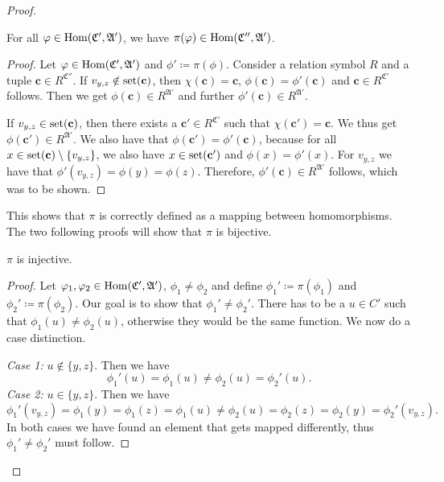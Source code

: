 \begin{proof}
	\begin{claim}
		For all $\varphi\in \operatorname{Hom}(\mathfrak C',\mathfrak A')$, we have $\pi(\varphi)\in\operatorname{Hom}(\mathfrak C'',\mathfrak A')$.
	\end{claim}
	\begin{proof}
		Let $\varphi\in\operatorname{Hom}(\mathfrak C',\mathfrak A')$ and $\phi'\coloneqq \pi(\phi)$.
		Consider a relation symbol $R$ and a tuple $\mathbf c \in R^{\mathfrak C''}$.
		If $v_{y,z}\notin\operatorname{set}(\mathbf c)$, then $\chi(\mathbf c)=\mathbf c$, $\phi(\mathbf c)=\phi'(\mathbf c)$ and $\mathbf c\in R^{\mathfrak C'}$ follows.
		Then we get $\phi(\mathbf c)\in R^{\mathfrak A'}$ and further $\phi'(\mathbf c)\in R^{\mathfrak A'}$.
		
		If $v_{y,z}\in\operatorname{set}(\mathbf c)$, then there exists a $\mathbf c'\in R^{\mathfrak C'}$ such that $\chi(\mathbf c')=\mathbf c$. 
		We thus get $\phi(\mathbf c')\in R^{\mathfrak A'}$.
		We also have that $\phi(\mathbf c')=\phi'(\mathbf c)$, because for all $x \in \operatorname{set}(\mathbf c)\setminus \{v_{y,z}\}$, we also have $x\in\operatorname{set}(\mathbf c')$ and $\phi(x)=\phi'(x)$.
		For $v_{y,z}$ we have that $\phi'(v_{y,z})=\phi(y)=\phi(z)$.
		Therefore, $\phi'(\mathbf c)\in R^{\mathfrak A'}$ follows, which was to be shown.
	\end{proof}
	
	This shows that $\pi$ is correctly defined as a mapping between homomorphisms.
	The two following proofs will show that $\pi$ is bijective.
	
	\begin{claim}
		$\pi$ is injective.
	\end{claim}
	\begin{proof}
		Let $\varphi_1,\varphi_2\in\operatorname{Hom}(\mathfrak C',\mathfrak A')$, $\phi_1\neq\phi_2$ and define $\phi_1'\coloneqq \pi(\phi_1)$ and $\phi_2'\coloneqq \pi(\phi_2)$.
		Our goal is to show that $\phi_1'\neq \phi_2'$.
		There has to be a $u\in C'$ such that $\phi_1(u)\neq\phi_2(u)$, otherwise they would be the same function.
		We now do a case distinction.
		
		\emph{Case 1:} $u\notin\{y,z\}$. Then we have
		$$\phi_1'(u)=\phi_1(u)\neq \phi_2(u)=\phi_2'(u).$$
		\emph{Case 2:} $u\in \{y,z\}$. Then we have 
		$$\phi_1'(v_{y,z})=\phi_1(y)=\phi_1(z)=\phi_1(u)\neq \phi_2(u)=\phi_2(z)=\phi_2(y)=\phi_2'(v_{y,z}).$$
		In both cases we have found an element that gets mapped differently, thus $\phi_1'\neq\phi_2'$ must follow.
	\end{proof}
	

\end{proof}
